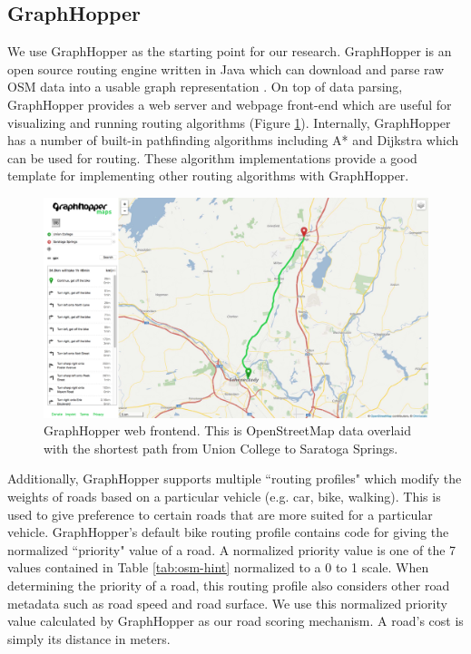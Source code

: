 \documentclass[11pt]{article}
\begin{document}
\subsection{GraphHopper}
\label{sec:graphhopper}
We use GraphHopper as the starting point for our research. GraphHopper is an open source routing engine written in Java which can download and parse raw OSM data into a usable graph representation \cite{graphhopper}. On top of data parsing, GraphHopper provides a web server and webpage front-end which are useful for visualizing and running routing algorithms (Figure \ref{tab:graphhopper-frontend}). Internally, GraphHopper has a number of built-in pathfinding algorithms including A* and Dijkstra which can be used for routing. These algorithm implementations provide a good template for implementing other routing algorithms with GraphHopper. 

\begin{figure}[h]
    \begin{center}
        \includegraphics[width=\textwidth]{figs/graphhopper}
    \end{center}
    \caption{GraphHopper web frontend. This is OpenStreetMap data overlaid with the shortest path from Union College to Saratoga Springs.}
    \label{tab:graphhopper-frontend}
\end{figure}

Additionally, GraphHopper supports multiple ``routing profiles" which modify the weights of roads based on a particular vehicle (e.g. car, bike, walking). This is used to give preference to certain roads that are more suited for a particular vehicle. GraphHopper's default bike routing profile contains code for giving the normalized ``priority" value of a road. A normalized priority value is one of the 7 values contained in Table \ref{tab:osm-hint} normalized to a 0 to 1 scale. When determining the priority of a road, this routing profile also considers other road metadata such as road speed and road surface. We use this normalized priority value calculated by GraphHopper as our road scoring mechanism. A road's cost is simply its distance in meters.
\end{document}
